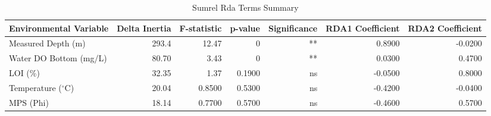 \begin{table}[htbp]
  \centering
  \caption{Sumrel Rda Terms Summary}
  \label{tab:ref_threshold_sensitivity_SumRel_rda_terms_summary}
  \small
  \begin{tabular}{lrrrrrr}
    \toprule
    Environmental Variable & Delta Inertia & F-statistic & p-value & Significance & RDA1 Coefficient & RDA2 Coefficient \\
    \midrule
    Measured Depth (m) & 293.4 & 12.47 & 0 & ** & 0.8900 & -0.0200 \\
    Water DO Bottom (mg/L) & 80.70 & 3.43 & 0 & ** & 0.0300 & 0.4700 \\
    LOI (\%) & 32.35 & 1.37 & 0.1900 & ns & -0.0500 & 0.8000 \\
    Temperature ($^{\circ}$C) & 20.04 & 0.8500 & 0.5300 & ns & -0.4200 & -0.0400 \\
    MPS (Phi) & 18.14 & 0.7700 & 0.5700 & ns & -0.4600 & 0.5700 \\
    \bottomrule
  \end{tabular}
\end{table}
